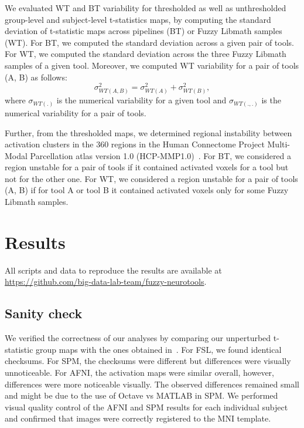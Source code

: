 \documentclass[conference]{IEEEtran}
\begin{document}
We evaluated WT and BT variability for thresholded as well as unthresholded
group-level and subject-level t-statistics maps, by computing the
standard deviation of t-statistic maps across pipelines (BT) or Fuzzy Libmath samples (WT). For BT, we computed the standard deviation 
across a given pair of tools.
For WT, we computed the standard deviation across the three
Fuzzy Libmath samples of a given tool. Moreover, we computed WT variability for a pair of tools (A, B) as follows:
\begin{equation}
  \sigma_{WT(A,B)}^2 = \sigma_{WT(A)}^2 + \sigma_{WT(B)}^2,
  \label{eq:wt-pair}
\end{equation}
where $\sigma_{WT(.)}$ is the numerical variability for a given tool
and $\sigma_{WT(., .)}$ is the numerical variability for a pair of tools.

Further, from the thresholded maps, we determined regional instability
between activation clusters in the 360 regions in the Human Connectome
Project Multi-Modal Parcellation atlas version 1.0
(HCP-MMP1.0)~\cite{glasser2016multi}. For BT, we considered a region
unstable for a pair of tools if it contained activated voxels for a tool
but not for the other one. For WT, we considered a region unstable for a
pair of tools (A, B) if for tool A or tool B it contained activated voxels only for some Fuzzy Libmath
samples.

\section{Results}
All scripts and data to reproduce the results are
available at \url{https://github.com/big-data-lab-team/fuzzy-neurotools}.


\subsection{Sanity check}

We verified the correctness of our analyses by comparing our unperturbed
t-statistic group maps with the ones obtained
in~\cite{bowring2019exploring}. For FSL, we found
identical checksums. For SPM, the checksums were different but differences
were visually unnoticeable. For AFNI, the activation maps were similar
overall, however, differences were more noticeable visually. 
The observed differences remained small and might be due to the use of
Octave vs MATLAB in SPM. We performed visual quality control of the AFNI
and SPM results for each individual subject and confirmed that images were
correctly registered to the MNI template.
\end{document}
